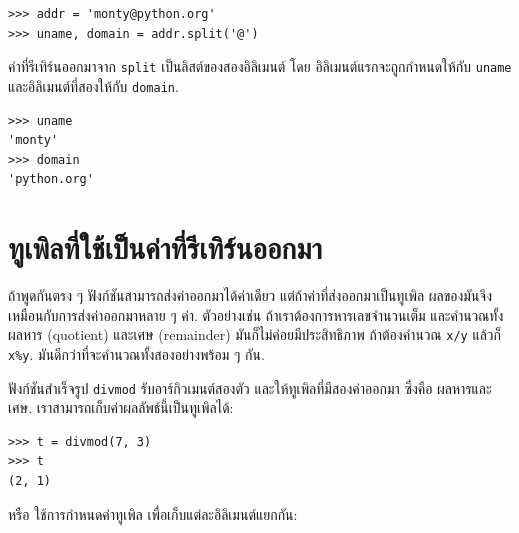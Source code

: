\begin{verbatim}
>>> addr = 'monty@python.org'
>>> uname, domain = addr.split('@')
\end{verbatim}
%
%
ค่าที่รีเทิร์นออกมาจาก \texttt{split} เป็นลิสต์ของสองอิลิเมนต์
โดย
อิลิเมนต์แรกจะถูกกำหนดให้กับ \texttt{uname}
และอิลิเมนต์ที่สองให้กับ \texttt{domain}.

\begin{verbatim}
>>> uname
'monty'
>>> domain
'python.org'
\end{verbatim}
%

\section{ทูเพิลที่ใช้เป็นค่าที่รีเทิร์นออกมา}



ถ้าพูดกันตรง ๆ ฟังก์ชันสามารถส่งค่าออกมาได้ค่าเดียว
แต่ถ้าค่าที่ส่งออกมาเป็นทูเพิล
ผลของมันจึงเหมือนกับการส่งค่าออกมาหลาย ๆ ค่า.
ตัวอย่างเช่น ถ้าเราต้องการหารเลขจำนวนเต็ม 
และคำนวณทั้ง ผลหาร (quotient) และเศษ (remainder)
มันก็ไม่ค่อยมีประสิทธิภาพ
ถ้าต้องคำนวณ \texttt{x/y} แล้วก็ \texttt{x\%y}.
มันดีกว่าที่จะคำนวณทั้งสองอย่างพร้อม ๆ กัน.


ฟังก์ชันสำเร็จรูป \texttt{divmod} รับอาร์กิวเมนต์สองตัว
และให้ทูเพิลที่มีสองค่าออกมา
ซึ่งคือ ผลหารและเศษ.
เราสามารถเก็บค่าผลลัพธ์นี้เป็นทูเพิลได้:

\begin{verbatim}
>>> t = divmod(7, 3)
>>> t
(2, 1)
\end{verbatim}
%
%
หรือ ใช้การกำหนดค่าทูเพิล เพื่อเก็บแต่ละอิลิเมนต์แยกกัน:

